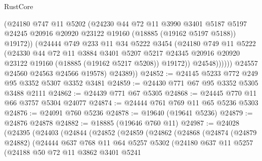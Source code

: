 \begin{lexlean}{RustCore}
\begin{coremodule}
                    (@24180
                      @747
                      @11
                      @5202
                      (@24230
                        @44
                        @72
                        @11
                        @3990
                        @3401
                        @5187
                        @5197
                        @24245
                        @20916
                        @20920
                        @23122
                        @19160
                        (@18885 (@19162 @5197 @5188))
                        @19172))
                    (@24444
                      @749
                      @233
                      @11
                      @34
                      @5222
                      @3454
                      (@24180
                        @749
                        @11
                        @5222
                        (@24330
                          @44
                          @72
                          @11
                          @3884
                          @3401
                          @5207
                          @5217
                          @24345
                          @20916
                          @20920
                          @23122
                          @19160
                          (@18885 (@19162 @5217 @5208))
                          @19172))
                      @24548))))))
          @24557
          @24560
          @24563
          @24566
          @19578)
        @24389))
@24852 := @24145 @5233 @772 @249 @95 @3352 @5307 @3352 @3481
@24859 := @24430 @771 @67 @95 @3352 @5305 @3488 @2111
@24862 := @24439 @771 @67 @5305
@24868 := @24445 @770 @11 @66 @3757 @5304 @24077
@24874 := @24444 @761 @769 @11 @65 @5236 @5303
@24876 := @24091 @760 @5236
@24878 := @19640 (@19641 @5236)
@24879 := @24876 @24878
@24882 := @18885 (@19646 @760 @11)
@24987 := @24028
    (@24395
      (@24403
        (@24844
          (@24852
            (@24859
              (@24862
                (@24868
                  (@24874
                    (@24879 @24882)
                    (@24444
                      @637
                      @768
                      @11
                      @64
                      @5257
                      @5302
                      (@24180
                        @637
                        @11
                        @5257
                        (@24188
                          @50
                          @72
                          @11
                          @3862
                          @3401
                          @5241

\end{coremodule}
\end{lexlean}
